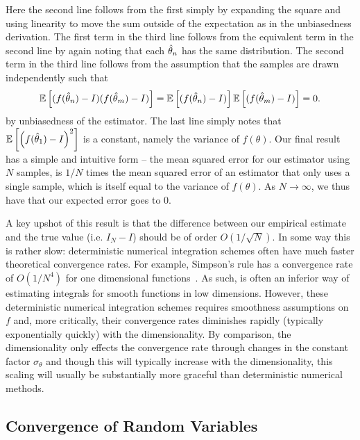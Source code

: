 Here the second line follows from the first simply by expanding the square and using linearity
to move the sum outside of the expectation as in the unbiasedness derivation.
The first term in the third line follows from the equivalent term in the second line by again noting that
each $\hat{\theta}_n$ has the same distribution.  The second term in the third line
follows from the assumption that the samples are drawn independently such that
\[
\mathbb{E}\left[ (f(\hat{\theta}_n)-I)(f(\hat{\theta}_m)-I)\right] = \mathbb{E}\left[ (f(\hat{\theta}_n)-I)\right] \mathbb{E}\left[(f(\hat{\theta}_m)-I)\right]=0.
\]
by unbiasedness of the estimator. The last line simply notes that $\mathbb{E}\left[ \left(f(\hat{\theta}_1)-I\right)^2\right]$ is a constant,
namely the variance of $f(\theta)$.
  Our final result has a simple and intuitive form -- the mean squared error for
our estimator using $N$ samples, is $1/N$ times the mean squared error of an estimator that only uses
a single sample, which is itself equal to the variance of $f(\theta)$.  As $N\rightarrow\infty$, we thus
have that our expected error goes to $0$.

A key upshot of this result is that the difference between our empirical estimate and the true value (i.e. $I_N-I$)
 should be of order $O(1/\sqrt{N})$.  In some way this is rather slow: deterministic numerical
integration schemes often have much faster theoretical convergence rates.  For example,
Simpson's rule has a convergence rate of $O(1/N^4)$ for one dimensional functions~\citep[Chapter 7]{owen2013mc}.  
As such, \mc is often an inferior way of estimating integrals for smooth functions
in low dimensions.  However, these deterministic numerical integration schemes
requires smoothness assumptions on $f$ and, more critically, their convergence rates diminishes rapidly (typically
exponentially quickly) with the dimensionality.   
By comparison, the dimensionality only effects the \mc convergence rate through changes in the 
constant factor $\sigma_{\theta}$
and though this will typically increase with the dimensionality, this 
scaling will usually be substantially more graceful than deterministic numerical methods.

\subsection{Convergence of Random Variables}
\label{sec:inf:mc:conv}


